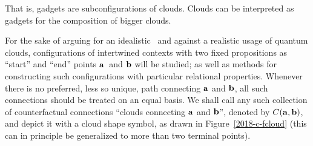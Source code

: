 That is, gadgets are subconfigurations of clouds. Clouds can be interpreted as gadgets for the composition of bigger clouds.

For the sake of arguing for an idealistic~\cite{berkeley,stace,Goldschmidt2017-idealism} and against a realistic usage of quantum clouds,
configurations of intertwined contexts with two fixed propositions
as ``start'' and ``end'' points ${\bf a}$~and ${\bf b}$ will be studied;
as well as methods for constructing such configurations with particular {relational} properties.
Whenever there is no preferred, less so unique, path connecting ${\bf a}$ and ${\bf b}$, all such connections should be treated on an equal basis.
We shall call any such collection of counterfactual connections ``{clouds} connecting ${\bf a}$ and ${\bf b}$'',
denoted by $C({\bf a},{\bf b})$, and depict it with a cloud shape symbol,
as drawn in Figure~\ref{2018-c-fcloud} (this can in principle be generalized to more than two terminal points).
